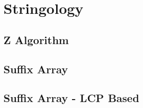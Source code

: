\section{Stringology}

\subsection{Z Algorithm} 



\subsection{Suffix Array}



\subsection{Suffix Array - LCP Based}


